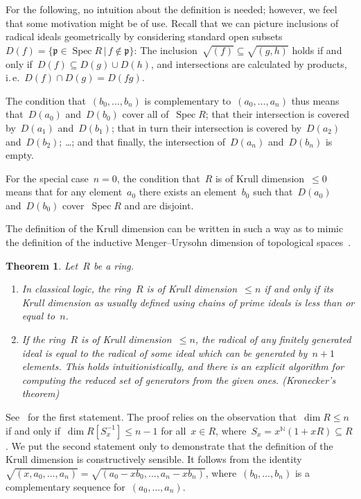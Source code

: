 \documentclass[10pt,reqno,a4paper]{amsbook}
\makeatletter
\theoremstyle{definition}
\theoremstyle{plain}
\newtheorem{thm}[defn]{Theorem}
\theoremstyle{remark}
\newcommand{\NN}{\mathbb{N}}
\newcommand{\ppp}{\mathfrak{p}}
\DeclareMathOperator{\Spec}{Spec}
\newcommand{\?}{\,{:}\,}
\renewcommand{\_}{\mathpunct{.}\,}
\newcommand{\ie}{i.\,e.\@\xspace}
\renewenvironment{proof}[1][\proofname]{\par
  \pushQED{\qed}%
  \normalfont \topsep6\p@\@plus6\p@\relax
  \trivlist
  \item[\hskip\labelsep
        \itshape
    #1\@addpunct{.}]\ignorespaces
}{%
  \popQED\endtrivlist\@endpefalse
}
\makeatother
\begin{document}
For the following, no intuition about the definition is needed; however, we
feel that some motivation might be of use. Recall that we can picture inclusions of
radical ideals geometrically by considering standard open subsets~$D(f) = \{
\ppp \in \Spec R \,|\, f \not\in \ppp \}$: The inclusion~$\sqrt{(f)} \subseteq
\sqrt{(g,h)}$ holds if and only if~$D(f) \subseteq D(g) \cup D(h)$, and
intersections are calculated by products, \ie~$D(f) \cap D(g) = D(fg)$.

The condition that~$(b_0,\ldots,b_n)$ is complementary to~$(a_0,\ldots,a_n)$
thus means that~$D(a_0)$ and~$D(b_0)$ cover all of~$\Spec R$; that their
intersection is covered by~$D(a_1)$ and~$D(b_1)$; that in turn their
intersection is covered by~$D(a_2)$ and~$D(b_2)$; \ldots; and that finally, the
intersection of~$D(a_n)$ and~$D(b_n)$ is empty.

For the special case~$n = 0$, the condition that~$R$ is of Krull
dimension~$\leq 0$ means that for any element~$a_0$ there exists an
element~$b_0$ such that~$D(a_0)$ and~$D(b_0)$ cover~$\Spec R$ and are disjoint.

The definition of the Krull dimension can be written in such a way as to mimic the
definition of the inductive Menger--Urysohn dimension of topological
spaces~\cite[Section~1]{dyn:krull-integral}.

\begin{thm}Let~$R$ be a ring.
\begin{enumerate}
\item In classical logic, the ring~$R$ is
of Krull dimension~$\leq n$ if and only if its Krull dimension
as usually defined using chains of prime ideals is less than or equal to~$n$.
\item If the ring~$R$ is
of Krull dimension~$\leq n$, the radical of any finitely generated ideal is
equal to the radical of some ideal which can be generated by~$n+1$ elements.
This holds intuitionistically, and there is an explicit algorithm for computing
the reduced set of generators from the given ones. (Kronecker's theorem)
\end{enumerate}
\end{thm}
\begin{proof}See~\cite[Theorem~1.2]{dyn:krull-integral} for the first
statement. The proof relies on the observation that~$\dim R \leq n$ if and only
if~$\dim R[S_x^{-1}] \leq n-1$ for all~$x \in R$, where~$S_x = x^\NN (1+xR)
\subseteq R$. We put the second statement only to demonstrate that the
definition of the Krull dimension is constructively sensible. It follows from
the identity~$\sqrt{(x,a_0,\ldots,a_n)} =
\sqrt{(a_0-xb_0,\ldots,a_n-xb_n)}$, where~$(b_0,\ldots,b_n)$ is a complementary
sequence for~$(a_0,\ldots,a_n)$.
\end{proof}
\end{document}
